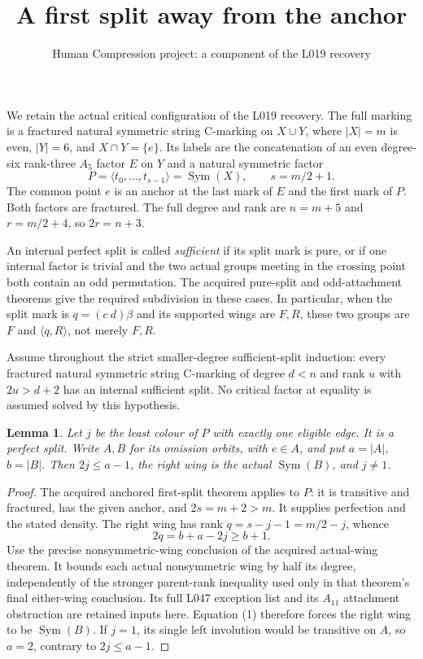 \documentclass[11pt,a4paper]{article}
\title{A first split away from the anchor}
\author{Human Compression project: a component of the L019 recovery}
\date{}
\newtheorem{lemma}{Lemma}\newtheorem{theorem}[lemma]{Theorem}
\newcommand{\gen}[1]{\langle#1\rangle}
\newcommand{\Sym}{\operatorname{Sym}}
\begin{document}
\maketitle
We retain the actual critical configuration of the L019 recovery.
The full marking is a fractured natural symmetric string C-marking
on $X\cup Y$, where $|X|=m$ is even, $|Y|=6$, and
$X\cap Y=\{e\}$. Its labels are the concatenation of an even
degree-six rank-three $A_5$ factor $E$ on $Y$ and a natural
symmetric factor
\[
                 P=\gen{t_0,\ldots,t_{s-1}}=\Sym(X),
                 \qquad s=m/2+1.
\]
The common point $e$ is an anchor at the last mark of $E$ and
the first mark of $P$. Both factors are fractured. The full
degree and rank are $n=m+5$ and $r=m/2+4$, so $2r=n+3$.

An internal perfect split is called \emph{sufficient} if its
split mark is pure, or if one internal factor is trivial and
the two actual groups meeting in the crossing point both
contain an odd permutation. The acquired pure-split and
odd-attachment theorems give the required subdivision in
these cases. In particular, when the split mark is
$q=(c\ d)\beta$ and its supported wings are $F,R$, these
two groups are $F$ and $\gen{q,R}$, not merely $F,R$.

Assume throughout the strict smaller-degree sufficient-split
induction: every fractured natural symmetric string C-marking
of degree $d<n$ and rank $u$ with $2u>d+2$ has an internal
sufficient split. No critical factor at equality is assumed
solved by this hypothesis.

\begin{lemma}\label{right}
Let $j$ be the least colour of $P$ with exactly one eligible
edge. It is a perfect split. Write $A,B$ for its omission
orbits, with $e\in A$, and put $a=|A|$, $b=|B|$.
Then $2j\le a-1$, the right wing is the actual $\Sym(B)$,
and $j\ne1$.
\end{lemma}
\begin{proof}
The acquired anchored first-split theorem applies to $P$:
it is transitive and fractured, has the given anchor, and
$2s=m+2>m$. It supplies perfection and the stated density.
The right wing has rank $q=s-j-1=m/2-j$, whence
\[
                         2q=b+a-2j\ge b+1.             \tag{1}
\]
Use the precise nonsymmetric-wing conclusion of the acquired
actual-wing theorem. It bounds each actual nonsymmetric wing
by half its degree, independently of the stronger parent-rank
inequality used only in that theorem's final either-wing
conclusion. Its full L047 exception list and its $A_{11}$
attachment obstruction are retained inputs here. Equation (1)
therefore forces the right wing to be $\Sym(B)$.
If $j=1$, its single left involution would be transitive
on $A$, so $a=2$, contrary to $2j\le a-1$.
\end{proof}
\end{document}
